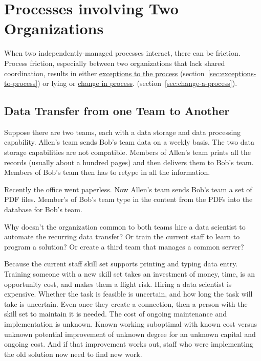\section{Processes involving Two Organizations\label{sec:processes-two-organizations}}

When two independently-managed processes interact, there can be friction. Process friction, especially between two  organizations that lack shared coordination, results in either \hyperref[sec:exceptions-to-process]{exceptions to the process} 
\ifsectionref
(section~\ref{sec:exceptions-to-process}) 
\fi
or lying or \hyperref[sec:change-a-process]{change in process}.
\ifsectionref
(section~\ref{sec:change-a-process}). 
\fi

\subsection*{Data Transfer from one Team to Another}

Suppose there are two teams, each with a data storage and data processing capability. Allen's team sends Bob's team data on a weekly basis. The two data storage capabilities are not compatible. Members of Allen's team prints all the records (usually about a hundred pages) and then delivers them to Bob's team. Members of Bob's team then has to retype in all the information.

Recently the office went paperless. Now Allen's team sends Bob's team a set of PDF files. Member's of Bob's team type in the content from the PDFs into the database for Bob's team.

Why doesn't the organization common to both teams hire a data scientist to automate the recurring data transfer? Or train the current staff to learn to program a solution? Or create a third team that manages a common server?

Because the current staff skill set supports printing and typing data entry. Training someone with a new skill set takes an investment of money, time, is an opportunity cost, and makes them a flight risk.
Hiring a data scientist is expensive. Whether the task is feasible is uncertain, and how long the task will take is uncertain. Even once they create a connection, then a person with the skill set to maintain it is needed. The cost of ongoing maintenance and implementation is unknown.
Known working suboptimal with known cost versus unknown potential improvement of unknown degree for an unknown capital and ongoing cost. And if that improvement works out, staff who were implementing the old solution now need to find new work.

